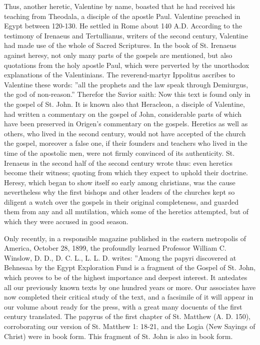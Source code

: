 Thus, another heretic, Valentine by name, boasted that he had received his teaching from Theodala, a disciple of the apostle Paul. Valentine preached in Egypt between 120-130. He settled in Rome about 140 A.D. According to the testimony of Irenaeus and Tertullianus, writers of the second century, Valentine had made use of the whole of Sacred Scriptures. In the book of St. Irenaeus against heresy, not only many parts of the gospels are mentioned, but also quotations from the holy apostle Paul, which were perverted by the unorthodox explanations of the Valentinians. The reverend-martyr Ippolitus ascribes to Valentine these words: ''all the prophets and the law speak through Demiurgus, the god of non-reason.'' Therefor the Savior saith:  Now this text is found only in the gospel of St. John. It is known also that Heracleon, a disciple of Valentine, had written a commentary on the gospel of John, considerable parts of which have been preserved in Origen's commentary on the gospels. Heretics as well as others, who lived in the second century, would not have accepted of the church the gospel, moreover a false one, if their founders and teachers who lived in the time of the apostolic men, were not firmly convinced of its authenticity. St. Irenaeus in the second half of the second century wrote thus:  even heretics become their witness; quoting from which they expect to uphold their doctrine. Heresy, which began to show itself so early among christians, was the cause nevertheless why the first bishops and other leaders of the churches kept so diligent a watch over the gospels in their original completeness, and guarded them from any and all mutilation, which some of the heretics attempted, but of which they were accused in good season.

Only recently, in a responsible magazine published in the eastern metropolis of America, October 28, 1899, the profoundly learned Professor William C. Winslow, D. D., D. C. L., L. L. D. writes: ''Among the papyri discovered at Behnesaa by the Egypt Exploration Fund is a fragment of the Gospel of St. John, which proves to be of the highest importance and deepest interest. It antedates all our previously known texts by one hundred years or more. Our associates have now completed their critical study of the text, and a facsimile of it will appear in our volume about ready for the press, with a great many docuents of the first century translated. The papyrus of the first chapter of St. Matthew (A. D. 150), corroborating our version of St. Matthew 1: 18-21, and the Logia (New Sayings of Christ) were in book form. This fragment of St. John is also in book form.

